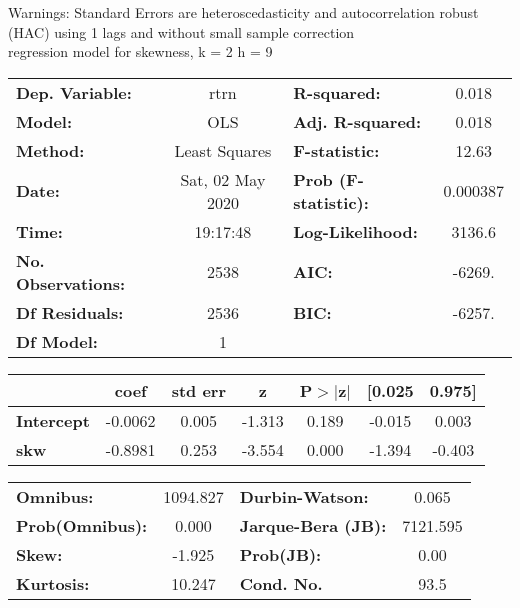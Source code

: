 Warnings: \newline
 [1] Standard Errors are heteroscedasticity and autocorrelation robust (HAC) using 1 lags and without small sample correction\\ 

regression model for skewness, k = 2 h = 9\begin{center}
\begin{tabular}{lclc}
\toprule
\textbf{Dep. Variable:}    &       rtrn       & \textbf{  R-squared:         } &     0.018   \\
\textbf{Model:}            &       OLS        & \textbf{  Adj. R-squared:    } &     0.018   \\
\textbf{Method:}           &  Least Squares   & \textbf{  F-statistic:       } &     12.63   \\
\textbf{Date:}             & Sat, 02 May 2020 & \textbf{  Prob (F-statistic):} &  0.000387   \\
\textbf{Time:}             &     19:17:48     & \textbf{  Log-Likelihood:    } &    3136.6   \\
\textbf{No. Observations:} &        2538      & \textbf{  AIC:               } &    -6269.   \\
\textbf{Df Residuals:}     &        2536      & \textbf{  BIC:               } &    -6257.   \\
\textbf{Df Model:}         &           1      & \textbf{                     } &             \\
\bottomrule
\end{tabular}
\begin{tabular}{lcccccc}
                   & \textbf{coef} & \textbf{std err} & \textbf{z} & \textbf{P$> |$z$|$} & \textbf{[0.025} & \textbf{0.975]}  \\
\midrule
\textbf{Intercept} &      -0.0062  &        0.005     &    -1.313  &         0.189        &       -0.015    &        0.003     \\
\textbf{skw}       &      -0.8981  &        0.253     &    -3.554  &         0.000        &       -1.394    &       -0.403     \\
\bottomrule
\end{tabular}
\begin{tabular}{lclc}
\textbf{Omnibus:}       & 1094.827 & \textbf{  Durbin-Watson:     } &    0.065  \\
\textbf{Prob(Omnibus):} &   0.000  & \textbf{  Jarque-Bera (JB):  } & 7121.595  \\
\textbf{Skew:}          &  -1.925  & \textbf{  Prob(JB):          } &     0.00  \\
\textbf{Kurtosis:}      &  10.247  & \textbf{  Cond. No.          } &     93.5  \\
\bottomrule
\end{tabular}
\end{center}

